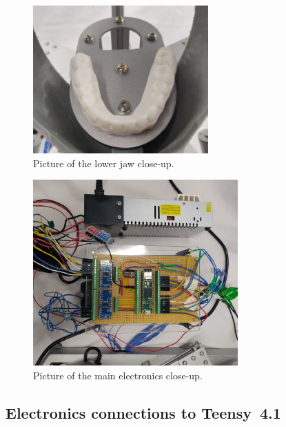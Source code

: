 \begin{figure}[H]
    \centering
    \includegraphics[width=0.6\textwidth]{figures/lower_jaw_close_up.jpg}
    \caption{Picture of the lower jaw close-up.}
    \label{fig:pic_lower_jaw_close_up}
\end{figure}

\begin{figure}[H]
    \centering
    \includegraphics[width=0.7\textwidth]{figures/elec_close_up.jpg}
    \caption{Picture of the main electronics close-up.}
    \label{fig:pic_elec_close_up}
\end{figure}

\subsection{Electronics connections to Teensy~4.1}

